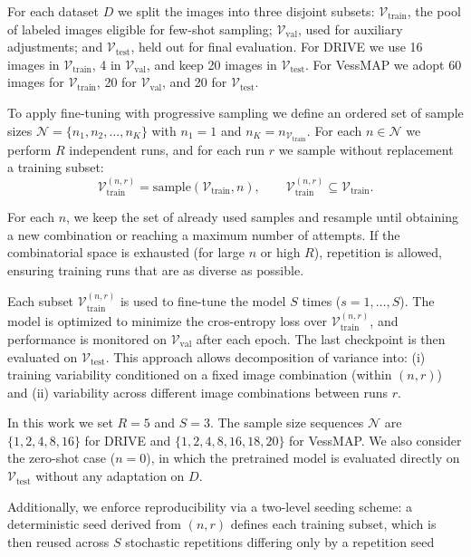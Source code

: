 \documentclass[%
reprint,
nofootinbib,
 amsmath,amssymb,
aps,
superscriptaddress,
showkeys,
longbibliography
]{revtex4-1}
\begin{document}
For each dataset $D$ we split the images into three disjoint subsets: $\mathcal{V}_{\text{train}}$, the pool of labeled images eligible for few-shot sampling; $\mathcal{V}_{\text{val}}$, used for auxiliary adjustments; and $\mathcal{V}_{\text{test}}$, held out for final evaluation. For DRIVE we use 16 images in $\mathcal{V}_{\text{train}}$, 4 in $\mathcal{V}_{\text{val}}$, and keep 20 images in $\mathcal{V}_{\text{test}}$. For VessMAP we adopt 60 images for $\mathcal{V}_{\text{train}}$, 20 for $\mathcal{V}_{\text{val}}$, and 20 for $\mathcal{V}_{\text{test}}$.

To apply fine-tuning with progressive sampling we define an ordered set of sample sizes $\mathcal{N} = \{ n_1, n_2, \ldots, n_K \}$ with $n_1 = 1$ and $n_K = n_{\mathcal{V}_{\text{train}}}$. For each $n \in \mathcal{N}$ we perform $R$ independent runs, and for each run $r$ we sample without replacement a training subset:
\[
\mathcal{V}^{(n,r)}_{\text{train}} = \text{sample}(\mathcal{V}_{\text{train}}, n), \qquad \mathcal{V}^{(n,r)}_{\text{train}} \subseteq \mathcal{V}_{\text{train}}.
\]


For each $n$, we keep the set of already used samples and resample until obtaining a new combination or reaching a maximum number of attempts. If the combinatorial space is exhausted (for large $n$ or high $R$), repetition is allowed, ensuring training runs that are as diverse as possible.

Each subset $\mathcal{V}^{(n,r)}_{\text{train}}$ is used to fine-tune the model $S$ times ($s=1,\ldots,S$). The model is optimized to minimize the cros-entropy loss over $\mathcal{V}^{(n,r)}_{\text{train}}$, and performance is monitored on $\mathcal{V}_{\text{val}}$ after each epoch. The last checkpoint is then evaluated on $\mathcal{V}_{\text{test}}$. This approach allows decomposition of variance into: (i) training variability conditioned on a fixed image combination (within $(n,r)$) and (ii) variability across different image combinations between runs $r$.

In this work we set $R=5$ and $S=3$. The sample size sequences $\mathcal{N}$ are $\{1,2,4,8,16\}$ for DRIVE and $\{1,2,4,8,16,18,20\}$ for VessMAP. We also consider the zero-shot case ($n=0$), in which the pretrained model is evaluated directly on $\mathcal{V}_{\text{test}}$ without any adaptation on $D$. 

Additionally, we enforce reproducibility via a two-level seeding scheme: a deterministic seed derived from $(n,r)$ defines each training subset, which is then reused across $S$ stochastic repetitions differing only by a repetition seed
\end{document}

